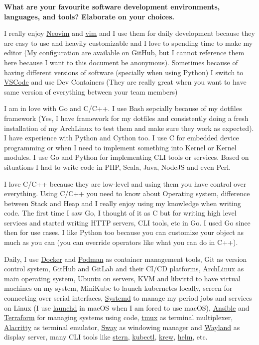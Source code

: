\noindent
\textbf{What are your favourite software development environments, languages, and tools? Elaborate on your choices.}

I really enjoy \href{https://neovim.io/}{Neovim} and \href{https://www.vim.org/}{vim} and I use them for daily development
because they are easy to use and heavily customizable and I love to spending time to make my editor
(My configuration are available on GitHub, but I cannot reference them here because I want to this document be anonymous).
Sometimes because of having different versions of software (specially when using Python) I switch to \href{https://code.visualstudio.com/}{VSCode}
and use Dev Containers (They are really great when you want to have same version of everything between your team members)

I am in love with Go and C/C++. I use Bash sepcially because of my dotfiles framework (Yes, I have framework for my dotfiles
and consistently doing a fresh installation of my ArchLinux to test them and make sure they work as expected). I have experience with
Python and Cython too. I use C for embedded device programming or when I need to implement something into
Kernel or Kernel modules. I use Go and Python for implementing CLI tools or services.
Based on situations I had to write code in PHP, Scala, Java, NodeJS and even Perl.

I love C/C++ because they are low-level and using them you have control over everything. Using C/C++ you need to know
about Operating system, difference between Stack and Heap and I really enjoy using my knowledge when writing code.
The first time I saw Go, I thought of it as C but for writing high level services and started writing HTTP servers,
CLI tools, etc in Go. I used Go since then for use cases. I like Python too because
you can customize your object as much as you can (you can override operators like what you can do in C++).

Daily, I use \href{https://www.docker.com/}{Docker} and \href{https://podman.io/}{Podman} as container management tools,
Git as version control system, GitHub and GitLab and their CI/CD platforms, ArchLinux as main operating system, Ubuntu
on servers, KVM and libvirtd to have virtual machines on my system, MiniKube to launch kubernetes locally,
screen for connecting over serial interfaces, \href{https://systemd.io/}{Systemd} to manage my period jobs and services
on Linux (I use \href{https://www.launchd.info/}{launchd} in macOS when I am fored to use macOS),
\href{https://www.ansible.com/}{Ansible} and \href{https://www.terraform.io/}{Terraform} for managing systems using code,
\href{https://github.com/tmux}{tmux} as terminal multiplexer,
\href{https://github.com/alacritty}{Alacritty} as terminal emulator,
\href{https://swaywm.org/}{Sway} as windowing manager and \href{https://wayland.freedesktop.org/}{Wayland} as display server,
many CLI tools like \href{https://github.com/stern/stern}{stern},
\href{https://kubernetes.io/docs/reference/kubectl/}{kubectl}, \href{https://krew.sigs.k8s.io/}{krew},
\href{https://helm.sh/}{helm}, etc.

